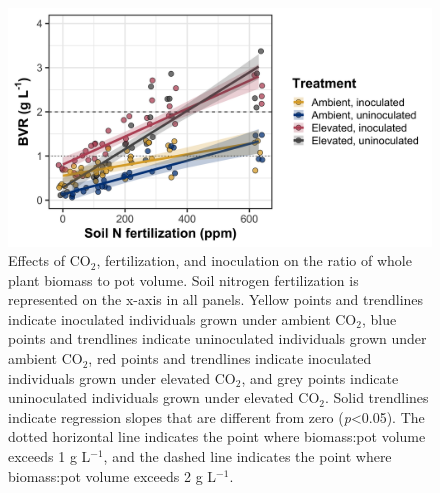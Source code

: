 \newpage
\begin{figure}
    \centering
    \includegraphics[scale = 0.07]{ch5_NxCO2xI/figs/NxCO2xI_figS2_bvr.png}
    \caption[Effects of CO$_2$, fertilization, and inoculation on the ratio of whole plant biomass to pot volume]{Effects of CO$_2$, fertilization, and inoculation on the ratio of whole plant biomass to pot volume. Soil nitrogen fertilization is represented on the x-axis in all panels. Yellow points and trendlines indicate inoculated individuals grown under ambient CO$_2$, blue points and trendlines indicate uninoculated individuals grown under ambient CO$_2$, red points and trendlines indicate inoculated individuals grown under elevated CO$_2$, and grey points indicate uninoculated individuals grown under elevated CO$_2$. Solid trendlines indicate regression slopes that are different from zero (\textit{p}<0.05). The dotted horizontal line indicates the point where biomass:pot volume exceeds 1 g L$^{-1}$, and the dashed line indicates the point where biomass:pot volume exceeds 2 g L$^{-1}$.}
    \label{fig:figure.d2}
\end{figure}
\clearpage
